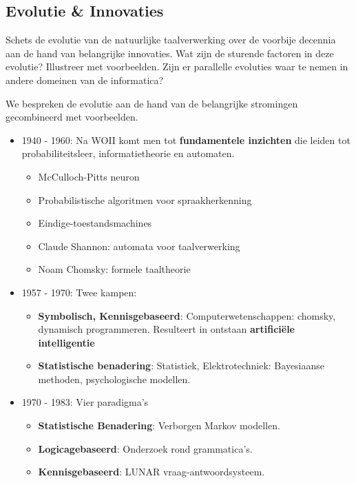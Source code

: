 \documentclass[../main.tex]{subfiles}
\begin{document}
\subsection{Evolutie \& Innovaties}
\begin{question}
Schets de evolutie van de natuurlijke taalverwerking over de voorbije decennia aan de hand van belangrijke innovaties. Wat zijn de sturende factoren in deze evolutie? Illustreer met voorbeelden.
Zijn er parallelle evoluties waar te nemen in andere domeinen van de informatica?
\end{question}

\begin{solution}
We bespreken de evolutie aan de hand van de belangrijke stromingen gecombineerd met voorbeelden.
\begin{itemize}
	\item 1940 - 1960: Na WOII komt men tot \textbf{fundamentele inzichten} die leiden tot probabiliteitsleer, informatietheorie en automaten.
	\begin{multicols}{2}
		\begin{itemize}
			\item McCulloch-Pitts neuron
			\item Probabilistische algoritmen voor spraakherkenning
			\item Eindige-toestandsmachines
			\item Claude Shannon: automata voor taalverwerking
			\item Noam Chomsky: formele taaltheorie
		\end{itemize}
	\end{multicols}
	\item 1957 - 1970: Twee kampen:
	\begin{itemize}
		\item \textbf{Symbolisch, Kennisgebaseerd}: Computerwetenschappen: chomsky, dynamisch programmeren. Resulteert in ontstaan \textbf{artifici\"ele intelligentie}
		\item \textbf{Statistische benadering}: Statistiek, Elektrotechniek: Bayesiaanse methoden, psychologische modellen.
	\end{itemize}
	\item 1970 - 1983: Vier paradigma's
	\begin{itemize}
		\item \textbf{Statistische Benadering}: Verborgen Markov modellen.
		\item \textbf{Logicagebaseerd}: Onderzoek rond grammatica's.
		\item \textbf{Kennisgebaseerd}: LUNAR vraag-antwoordsysteem.

\end{itemize}
\end{itemize}
\end{solution}
\end{document}

